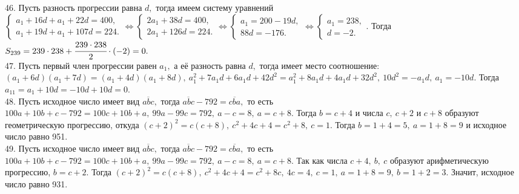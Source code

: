 46. Пусть разность прогрессии равна $d,$ тогда имеем систему уравнений\\ $\begin{cases} a_1+16d+a_1+22d=400,\\a_1+19d+a_1+107d=224.\end{cases}\Leftrightarrow
\begin{cases} 2a_1+38d=400,\\2a_1+126d=224.\end{cases}\Leftrightarrow
\begin{cases} a_1=200-19d,\\88d=-176.\end{cases}\Leftrightarrow
\begin{cases} a_1=238,\\ d=-2.\end{cases}.$ Тогда $S_{239}=239\cdot238+\cfrac{239\cdot238}{2}\cdot(-2)=0.$\\
47. Пусть первый член прогрессии равен $a_1,$ а её разность равна $d,$ тогда имеет место соотношение:
$(a_1+6d)(a_1+7d)=(a_1+4d)(a_1+8d),\ a_1^2+7a_1d+6a_1d+42d^2=a_1^2+8a_1d+4a_1d+32d^2,\ 10d^2=-a_1d,\ a_1=-10d.$ Тогда $a_{11}=a_1+10d=-10d+10d=0.$\\
48. Пусть исходное число имеет вид $\overline{abc},$ тогда
$\overline{abc}-792=\overline{cba},$ то есть
$100a+10b+c-792=100c+10b+a,\ 99a-99c=792,\ a-c=8,\ a=c+8.$ Тогда $b=c+4$ и числа $c,\ c+2$ и $c+8$ образуют геометрическую прогрессию, откуда $(c+2)^2=c(c+8),\ c^2+4c+4=c^2+8,\ c=1.$ Тогда $b=1+4=5,\ a=1+8=9$ и исходное число равно 951.\\
49. Пусть исходное число имеет вид $\overline{abc},$ тогда
$\overline{abc}-792=\overline{cba},$ то есть
$100a+10b+c-792=100c+10b+a,\ 99a-99c=792,\ a-c=8,\ a=c+8.$ Так как числа $c+4,\ b,\ c$ образуют арифметическую прогрессию, $b=c+2.$ Тогда $(c+2)^2=c(c+8),\ c^2+4c+4=c^2+8c,\ 4c=4,\ c=1,\ a=1+8=9,\ b=1+2=3.$ Значит, исходное число равно 931.
\newpage
